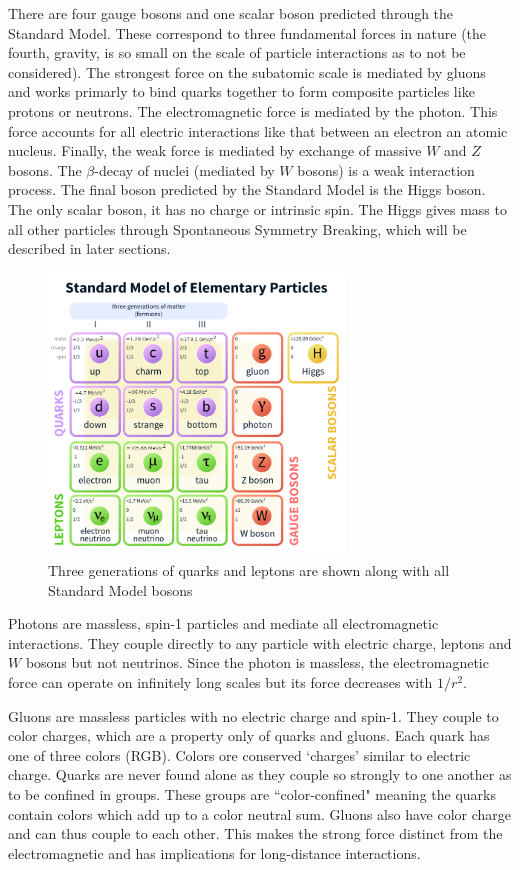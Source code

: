 There are four gauge bosons and one scalar boson predicted through the Standard Model. These correspond to three fundamental forces in nature (the fourth, gravity, is so small on the scale of particle interactions as to not be considered). The strongest force on the subatomic scale is mediated by gluons and works primarly to bind quarks together to form composite particles like protons or neutrons. The electromagnetic force is mediated by the photon. This force accounts for all electric interactions like that between an electron an atomic nucleus. Finally, the weak force is mediated by exchange of massive $W$ and $Z$ bosons. The $\beta$-decay of nuclei (mediated by $W$ bosons) is a weak interaction process. The final boson predicted by the Standard Model is the Higgs boson. The only scalar boson, it has no charge or intrinsic spin. The Higgs gives mass to all other particles through Spontaneous Symmetry Breaking, which will be described in later sections.
\begin{figure}[H]
	\centering
    \includegraphics[width=0.7\textwidth] {Pictures/SMparticles.png}\hspace{1cm}
    \caption{Three generations of quarks and leptons are shown along with all Standard Model bosons \cite{PDG}}
    \label{fig:SMparticles}
\end{figure}
Photons are massless, spin-1 particles and mediate all electromagnetic interactions. They couple directly to any particle with electric charge, leptons and $W$ bosons but not neutrinos. Since the photon is massless, the electromagnetic force can operate on infinitely long scales but its force decreases with $1/r^2$.
 
Gluons are massless particles with no electric charge and spin-1. They couple to color charges, which are a property only of quarks and gluons. Each quark has one of three colors (RGB). Colors ore conserved `charges' similar to electric charge. Quarks are never found alone as they couple so strongly to one another as to be confined in groups. These groups are ``color-confined" meaning the quarks contain colors which add up to a color neutral sum.  Gluons also have color charge and can thus couple to each other. This makes the strong force distinct from the electromagnetic and has implications for long-distance interactions.
 
